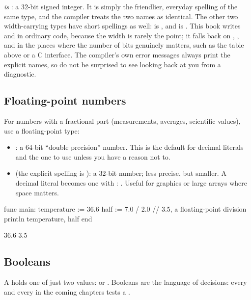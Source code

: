\begin{note}
 \emph{is} : a 32-bit signed integer. It is simply the
friendlier, everyday spelling of the same type, and the compiler treats the two
names as identical. The other two width-carrying types have short spellings as
well:  is , and  is . This book writes
 and  in ordinary code, because the width is rarely the
point; it falls back on , , and  in the places
where the number of bits genuinely matters, such as the table above or a C
interface. The compiler's own error messages always print the explicit names, so
do not be surprised to see  looking back at you from a diagnostic.
\end{note}

\subsection{Floating-point numbers}

For numbers with a fractional part (measurements, averages, scientific
values), use a floating-point type:

\begin{itemize}[leftmargin=1.4em]
  \item {}: a 64-bit ``double precision'' number. This is the default
        for decimal literals and the one to use unless you have a reason not to.
  \item {} (the explicit spelling is ): a 32-bit number;
        less precise, but smaller. A decimal literal becomes one with
        : . Useful for graphics or large arrays where
        space matters.
\end{itemize}

\begin{salamen}
func main:
    temperature := 36.6
    half := 7.0 / 2.0        // 3.5, a floating-point division
    println temperature, half
end
\end{salamen}

\begin{progout}
36.6 3.5
\end{progout}

\subsection{Booleans}

A  holds one of just two values:  or . Booleans
are the language of decisions: every  and every  in the
coming chapters tests a .

